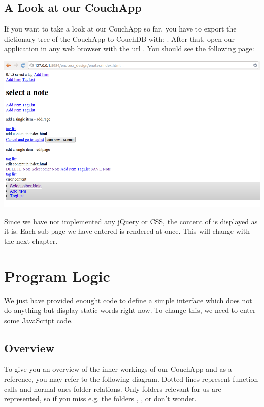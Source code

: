 \documentclass[letterpaper,10pt,english]{sphinxmanual}
\begin{document}
\section{A Look at our CouchApp}
\label{3-Interface:a-look-at-our-couchapp}
If you want to take a look at our CouchApp so far, you have to export the dictionary tree of the CouchApp to CouchDB with: . After that, open our application in any web browser with the url .
You should see the following page:

\includegraphics{3_final.png}

Since we have not implemented any jQuery or CSS, the content of  is displayed as it is. Each sub page we have entered is rendered at once. This will change with the next chapter.


\chapter{Program Logic}
\label{4-Logic:program-logic}\label{4-Logic::doc}
We just have provided enought code to define a simple interface which does not do anything but display static words right now. To change this, we need to enter some JavaScript code.


\section{Overview}
\label{4-Logic:overview}
To give you an overview of the inner workings of our CouchApp and as a reference, you may refer to the following diagram. Dotted lines represent function calls and normal ones folder relations. Only folders relevant for us are represented, so if you miss e.g. the folders , ,  or  don't wonder.
\end{document}
